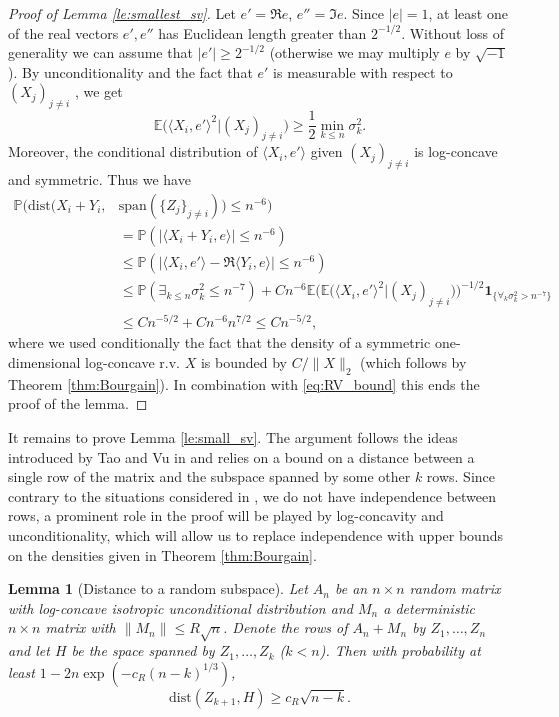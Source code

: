 \documentclass[12pt,reqno]{amsart}
\newtheorem{lemma}{Lemma}[section]
\begin{document}
\begin{proof}[Proof of Lemma \ref{le:smallest_sv}]
  
  Let $e' = \Re e$, $e'' = \Im e$. Since $|e| = 1$, at least one of the real
  vectors $e',e''$ has Euclidean length greater than $2^{-1/2}$. Without loss of generality we can assume that $|e'| \ge 2^{-1/2}$ (otherwise we may multiply $e$ by $\sqrt{-1}$). By
  unconditionality and the fact that $e'$ is measurable with respect to
  $(X_j)_{j\neq i}$ , we get
  \[
  {\mathbb{E}}\Big(\langle X_i,e'\rangle^2|(X_j)_{j\neq i}\Big)   \ge \frac{1}{2}\min_{k\le n} \sigma_k^2.
  \]
  Moreover, the conditional distribution of $\langle X_i,e'\rangle$ given
  $(X_j)_{j\neq i}$ is log-concave and symmetric. Thus we have
  \begin{align*}
    {\mathbb{P}}({\mathrm{dist}}(X_i+Y_i,&{\mathrm{span}}(\{Z_j\}_{j\neq i}))\le n^{-6}) \\
    &= {\mathbb{P}}(|\langle X_i+Y_i,e\rangle| \le n^{-6}) \\
    &\le {\mathbb{P}}(|\langle X_i,e'\rangle - \Re \langle Y_i,e\rangle| \le n^{-6})\\
    &\le {\mathbb{P}}(\exists_{k\le n} \sigma_k^2 \le n^{-7}) + C n^{-6}{\mathbb{E}}\Big({\mathbb{E}}\Big(\langle X_i,e'\rangle^2|(X_j)_{j\neq i}\Big)\Big)^{-1/2}{\mathbf{1}_{\{{\forall_k \sigma_k^2> n^{-7}}\}}}\\
    &\le Cn^{-5/2} + Cn^{-6}n^{7/2} \le C n^{-5/2},
  \end{align*}
  where we used conditionally the fact that the density of a symmetric
  one-dimensional log-concave r.v. $X$ is bounded by $C/\|X\|_2$ (which
  follows by Theorem \ref{thm:Bourgain}). In combination with
  \eqref{eq:RV_bound} this ends the proof of the lemma.
\end{proof}

It remains to prove Lemma \ref{le:small_sv}. The argument follows the ideas
introduced by Tao and Vu in \cite{TV} and relies on a bound on a distance
between a single row of the matrix and the subspace spanned by some other $k$
rows. Since contrary to the situations considered in \cite{TV,CircLawUnc}, we
do not have independence between rows, a prominent role in the proof will be
played by log-concavity and unconditionality, which will allow us to replace
independence with upper bounds on the densities given in Theorem
\ref{thm:Bourgain}.

\begin{lemma}[Distance to a random subspace]\label{le:distance} Let $A_n$ be
  an $n\times n$ random matrix with log-concave isotropic unconditional
  distribution and $M_n$ a deterministic $n\times n$ matrix with $\|M_n\| \le
  R\sqrt{n}$. Denote the rows of $A_n+M_n$ by $Z_1,\ldots,Z_n$ and let $H$ be
  the space spanned by $Z_1,\ldots,Z_k$ ($k < n$). Then with probability at
  least $1 - 2n\exp(-c_R (n-k)^{1/3})$,
  \[
  {\mathrm{dist}}(Z_{k+1},H) \ge c_R \sqrt{n-k}.
  \]
\end{lemma}
\end{document}
